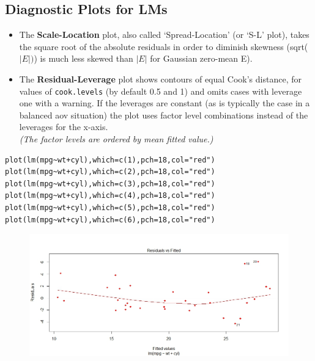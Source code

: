 \documentclass[12pt, a4paper]{article}
\theoremstyle{plain}
\theoremstyle{definition}
\theoremstyle{remark}
\begin{document}
\subsection{Diagnostic Plots for LMs}
\begin{itemize}
\item
The \textbf{Scale-Location} plot, also called ‘Spread-Location’ (or ‘S-L’ plot), takes the square root of the absolute residuals in order to diminish skewness (sqrt($|E|)$) is much less skewed than $| E |$ for Gaussian zero-mean E).

\item
The \textbf{Residual-Leverage} plot shows contours of equal Cook's distance, for values of \texttt{cook.levels} (by default 0.5 and 1) and omits cases with leverage one with a warning. If the leverages are constant (as is typically the case in a balanced aov situation) the plot uses factor level combinations instead of the leverages for the x-axis. \\
\textit{(The factor levels are ordered by mean fitted value.)}
\end{itemize}
\begin{framed}
\begin{verbatim}
plot(lm(mpg~wt+cyl),which=c(1),pch=18,col="red")
plot(lm(mpg~wt+cyl),which=c(2),pch=18,col="red")
plot(lm(mpg~wt+cyl),which=c(3),pch=18,col="red")
plot(lm(mpg~wt+cyl),which=c(4),pch=18,col="red")
plot(lm(mpg~wt+cyl),which=c(5),pch=18,col="red")
plot(lm(mpg~wt+cyl),which=c(6),pch=18,col="red")
\end{verbatim}
\end{framed}

\begin{figure}[h!]
\centering
\includegraphics[width=0.9\linewidth]{./mtcarsDiagPlot1}

\label{mtcarsDiagPlot1}
\end{figure}
\end{document}
